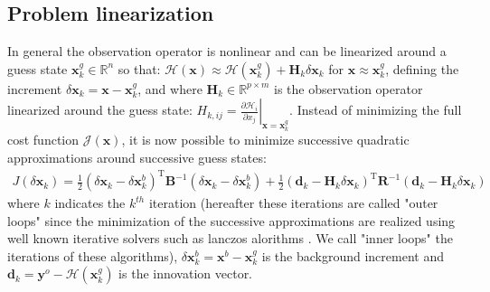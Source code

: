 \documentclass[npg, manuscript]{copernicus}
\begin{document}
\subsection{Problem linearization}
In general the observation operator is nonlinear and can be linearized around a guess state $\mathbf{x}^g_k \in \mathbb{R}^n$ so that: $\mathcal{H}(\mathbf{x}) \approx \mathcal{H}(\mathbf{x}^g_k) + \mathbf{H}_k \delta \mathbf{x}_k$ for $\mathbf{x} \approx \mathbf{x}^g_k$, defining the increment $\delta \mathbf{x}_k =  \mathbf{x}-\mathbf{x}^g_k$, and where $\mathbf{H}_k \in \mathbb{R}^{p \times m}$ is the observation operator linearized around the guess state: $H_{k,ij} = \left.\frac{\partial \mathcal{H}_i}{\partial x_j}\right|_{\mathbf{x} = \mathbf{x}^g_k}$. Instead of minimizing the full cost function $\mathcal{J}(\mathbf{x})$, it is now possible to minimize successive quadratic approximations around successive guess states:
\begin{align}
\label{eq:cost_quad}
J \left(\delta \mathbf{x}_k\right) = \frac{1}{2} \left(\delta \mathbf{x}_k-\delta \mathbf{x}^b_k\right)^\mathrm{T} \mathbf{B}^{-1} \left(\delta \mathbf{x}_k-\delta \mathbf{x}^b_k\right) + \frac{1}{2} \left(\mathbf{d}_k - \mathbf{H}_k \delta \mathbf{x}_k\right)^\mathrm{T} \mathbf{R}^{-1} \left(\mathbf{d}_k - \mathbf{H}_k \delta \mathbf{x}_k\right)
\end{align}
where $k$ indicates the $k^{th}$ iteration (hereafter these iterations are called "outer loops" since the minimization of the successive approximations are realized using well known iterative solvers such as lanczos alorithms \cite{}. We call "inner loops" the iterations of these algorithms), $\delta \mathbf{x}^b_k = \mathbf{x}^b - \mathbf{x}^g_k$ is the background increment and $\mathbf{d}_k = \mathbf{y}^o - \mathcal{H}(\mathbf{x}^g_k)$ is the innovation vector.\\
\end{document}
